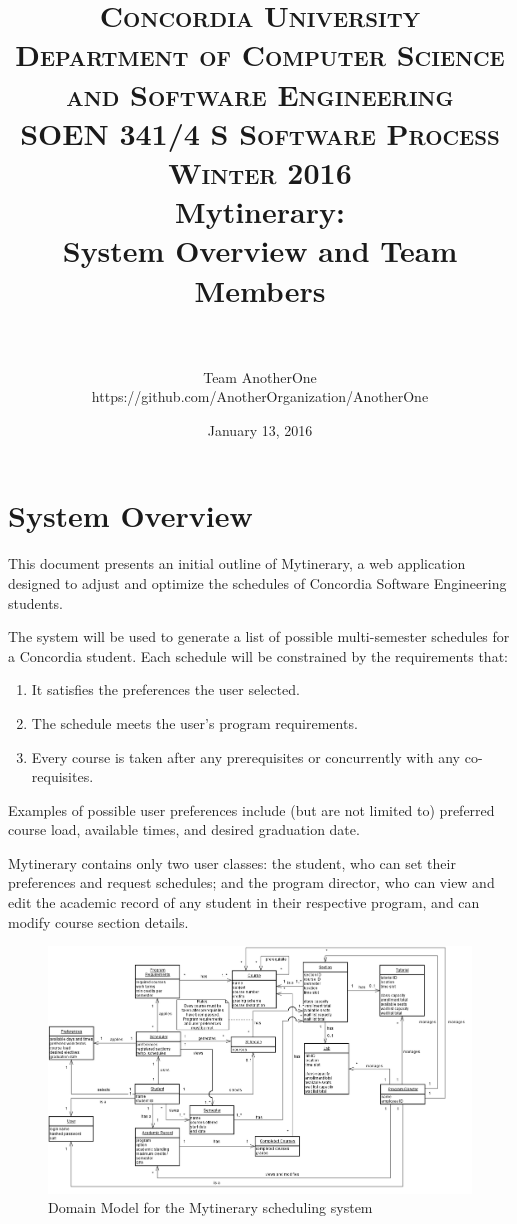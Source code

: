 \documentclass[paper=a4, fontsize=11pt, oneside]{scrartcl} %
\title{	
\normalfont \normalsize 
\textsc{Concordia University} \\
\textsc{Department of Computer Science and Software Engineering} \\
\textsc{SOEN 341/4 S \qquad Software Process \qquad Winter 2016} %
\horrule{0.5pt} \\[0.4cm] %
\huge Mytinerary: \\ System Overview and Team Members \\ %
\horrule{2pt} \\[0.5cm] %
}
\author{Team AnotherOne\\ \small{https://github.com/AnotherOrganization/AnotherOne}} %
\date{\normalsize January 13, 2016} %
\begin{document}
\maketitle %


\section*{System Overview}
This document presents an initial outline of Mytinerary, a web application designed to adjust and optimize the schedules of Concordia Software Engineering students.

The system will be used to generate a list of possible multi-semester schedules for a Concordia student. Each schedule will be constrained by the requirements that:
\begin{enumerate}[label={\arabic*)}]
\item It satisfies the preferences the user selected.
\item The schedule meets the user's program requirements.
\item Every course is taken after any prerequisites or concurrently with any co-requisites. 
\end{enumerate}
Examples of possible user preferences include (but are not limited to) preferred course load, available times, and desired graduation date.

Mytinerary contains only two user classes: the student, who can set their preferences and request schedules; and the program director, who can view and edit the academic record of any student in their respective program, and can modify course section details.

\begin{figure}[H]
\centering
\includegraphics[width=1.4\textwidth, angle=-90]{domain_model}
\caption{Domain Model for the Mytinerary scheduling system}
\label{fig:domain_model}
\end{figure}
\end{document}
